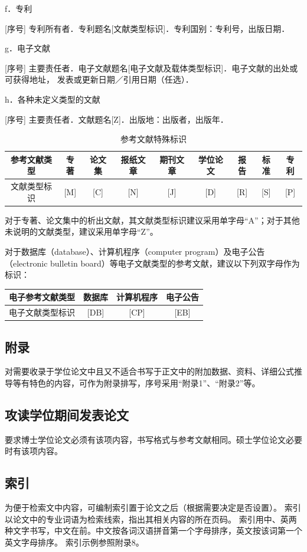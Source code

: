 f．专利

[序号] 专利所有者．专利题名[文献类型标识]．专利国别：专利号，出版日期．

g．电子文献

[序号] 主要责任者．电子文献题名[电子文献及载体类型标识]．电子文献的出处或可获得地址，
发表或更新日期／引用日期（任选）．

h．各种未定义类型的文献

[序号] 主要责任者．文献题名[Z]．出版地：出版者，出版年．

\begin{table}[h]
    \centering
    \caption{参考文献特殊标识}
    \begin{tabular}{|c|c|c|c|c|c|c|c|c|}
        \hline
        参考文献类型&专著&论文集&报纸文章&期刊文章&学位论文&报告&标准&专利\\
        \hline
        文献类型标识&[M]&[C]&[N]&[J]&[D]&[R]&[S]&[P]\\
        \hline
    \end{tabular}
\end{table}

对于专著、论文集中的析出文献，其文献类型标识建议采用单字母“A”；对于其他未说明的文献类型，建议采用单字母“Z”。

对于数据库（database）、计算机程序（computer program）及电子公告（electronic bulletin board）等电子文献类型的参考文献，建议以下列双字母作为标识：
\begin{table}[h]
    \centering
    \begin{tabular}{|c|c|c|c|}
        \hline
        电子参考文献类型&数据库&计算机程序&电子公告\\
        \hline
        电子文献类型标识&[DB]&[CP]&[EB]\\
        \hline
    \end{tabular}
\end{table}

\subsection{附录}

对需要收录于学位论文中且又不适合书写于正文中的附加数据、资料、详细公式推导等有特色的内容，可作为附录排写，序号采用“附录1”、“附录2”等。

\subsection{攻读学位期间发表论文}
要求博士学位论文必须有该项内容，书写格式与参考文献相同。硕士学位论文必要时有该项内容。

\subsection{索引}

为便于检索文中内容，可编制索引置于论文之后（根据需要决定是否设置）。
索引以论文中的专业词语为检索线索，指出其相关内容的所在页码。
索引用中、英两种文字书写，中文在前。中文按各词汉语拼音第一个字母排序，英文按该词第一个英文字母排序。
索引示例参照附录8。



